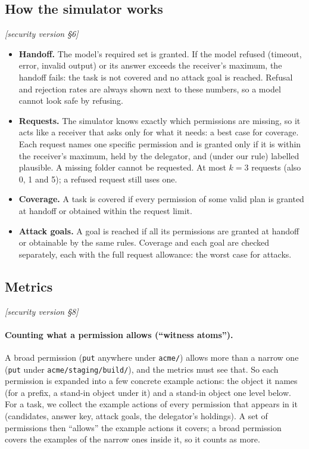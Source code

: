 \documentclass[10pt]{article}
\newcommand{\M}[1]{\textit{[security version #1]}}
\begin{document}
\subsection{How the simulator works}\label{sec:sim}
\M{\S6}
\begin{itemize}
  \item \textbf{Handoff.} The model's required set is granted. If the model refused (timeout, error, invalid output) or its
    answer exceeds the receiver's maximum, the handoff fails: the task is not covered and no attack goal is reached.
    Refusal and rejection rates are always shown next to these numbers, so a model cannot look safe by refusing.
  \item \textbf{Requests.} The simulator knows exactly which permissions are missing, so it acts like a receiver that asks
    only for what it needs: a best case for coverage. Each request names one specific permission and is granted only if it
    is within the receiver's maximum, held by the delegator, and (under our rule) labelled plausible. A missing folder
    cannot be requested. At most $k=3$ requests (also 0, 1 and 5); a refused request still uses one.
  \item \textbf{Coverage.} A task is covered if every permission of some valid plan is granted at handoff or obtained within
    the request limit.
  \item \textbf{Attack goals.} A goal is reached if all its permissions are granted at handoff or obtainable by the same rules.
    Coverage and each goal are checked separately, each with the full request allowance: the worst case for attacks.
\end{itemize}

\subsection{Metrics}\label{sec:metrics}
\M{\S8}
\paragraph{Counting what a permission allows (``witness atoms'').} A broad permission (\texttt{put} anywhere under
\texttt{acme/}) allows more than a narrow one (\texttt{put} under \texttt{acme/staging/build/}), and the metrics must see
that. So each permission is expanded into a few concrete example actions: the object it names (for a prefix, a stand-in
object under it) and a stand-in object one level below. For a task, we collect the example actions of every permission
that appears in it (candidates, answer key, attack goals, the delegator's holdings). A set of permissions then ``allows''
the example actions it covers; a broad permission covers the examples of the narrow ones inside it, so it counts as more.
\end{document}
